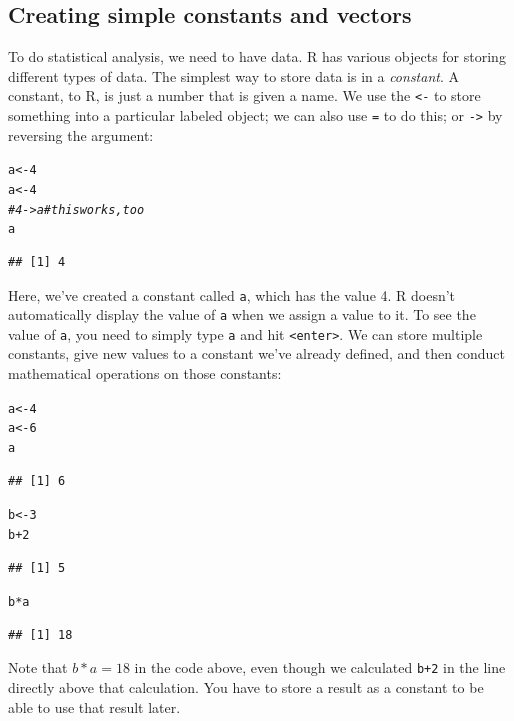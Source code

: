 \documentclass[12pt]{article}\usepackage[]{graphicx}\usepackage[]{color}
\makeatletter
\newcommand{\hlnum}[1]{\textcolor[rgb]{0.686,0.059,0.569}{#1}}%
\newcommand{\hlcom}[1]{\textcolor[rgb]{0.678,0.584,0.686}{\textit{#1}}}%
\newcommand{\hlopt}[1]{\textcolor[rgb]{0,0,0}{#1}}%
\newcommand{\hlstd}[1]{\textcolor[rgb]{0.345,0.345,0.345}{#1}}%
\newcommand{\hlkwb}[1]{\textcolor[rgb]{0.69,0.353,0.396}{#1}}%
\newenvironment{kframe}{%
 \def\at@end@of@kframe{}%
 \ifinner\ifhmode%
  \def\at@end@of@kframe{\end{minipage}}%
  \begin{minipage}{\columnwidth}%
 \fi\fi%
 \def\FrameCommand##1{\hskip\@totalleftmargin \hskip-\fboxsep
 \colorbox{shadecolor}{##1}\hskip-\fboxsep
     \hskip-\linewidth \hskip-\@totalleftmargin \hskip\columnwidth}%
 \MakeFramed {\advance\hsize-\width
   \@totalleftmargin\z@ \linewidth\hsize
   \@setminipage}}%
 {\par\unskip\endMakeFramed%
 \at@end@of@kframe}
\newenvironment{knitrout}{}{} %
\makeatother
\begin{document}
\subsection{Creating simple constants and vectors}
To do statistical analysis, we need to have data. R has various objects for storing different types of data. The simplest way to store data is in a \emph{constant}. A constant, to R, is just a number that is given a name. We use the \texttt{<-} to store something into a particular labeled object; we can also use \texttt{=} to do this; or \texttt{->} by reversing the argument:
\begin{knitrout}
\color{fgcolor}\begin{kframe}
\begin{alltt}
\hlstd{a}\hlkwb{<-}\hlnum{4}
\hlstd{a} \hlkwb{<-} \hlnum{4}
\hlcom{# 4->a # this works, too}
\hlstd{a}
\end{alltt}
\begin{verbatim}
## [1] 4
\end{verbatim}
\end{kframe}
\end{knitrout}
Here, we've created a constant called \texttt{a}, which has the value 4. R doesn't automatically display the value of \texttt{a} when we assign a value to it. To see the value of \texttt{a}, you need to simply type \texttt{a} and hit \texttt{<enter>}. We can store multiple constants, give new values to a constant we've already defined, and then conduct mathematical operations on those constants:
\begin{knitrout}
\color{fgcolor}\begin{kframe}
\begin{alltt}
\hlstd{a} \hlkwb{<-} \hlnum{4}
\hlstd{a} \hlkwb{<-} \hlnum{6}
\hlstd{a}
\end{alltt}
\begin{verbatim}
## [1] 6
\end{verbatim}
\begin{alltt}
\hlstd{b} \hlkwb{<-} \hlnum{3}
\hlstd{b}\hlopt{+}\hlnum{2}
\end{alltt}
\begin{verbatim}
## [1] 5
\end{verbatim}
\begin{alltt}
\hlstd{b}\hlopt{*}\hlstd{a}
\end{alltt}
\begin{verbatim}
## [1] 18
\end{verbatim}
\end{kframe}
\end{knitrout}
Note that $b*a=18$ in the code above, even though we calculated \texttt{b+2} in the line directly above that calculation. You have to store a result as a constant to be able to use that result later.
\end{document}
